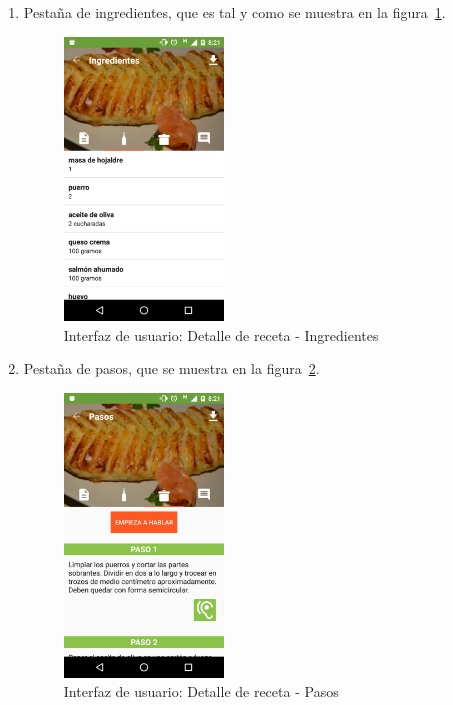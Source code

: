 \begin{enumerate}
\item Pestaña de ingredientes, que es tal y como se muestra en la
  figura~\ref{fig:captura_10}.
  
  \begin{figure}[htbp]
    \centering
    \includegraphics[width=0.4\textwidth]{cap5/img/captura_10}
    \caption{Interfaz de usuario: Detalle de receta - Ingredientes}
    \label{fig:captura_10}
  \end{figure}


\item Pestaña de pasos, que se muestra en la figura~\ref{fig:captura_11}.
  
  \begin{figure}[htbp]
    \centering
    \includegraphics[width=0.4\textwidth]{cap5/img/captura_11}
    \caption{Interfaz de usuario: Detalle de receta - Pasos}
    \label{fig:captura_11}
  \end{figure}


\end{enumerate}
